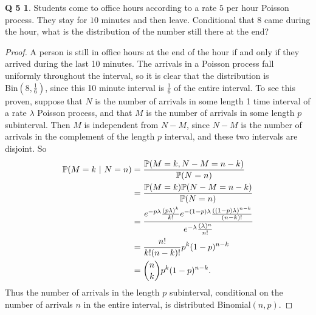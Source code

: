 \documentclass[12pt]{article}
\newcommand{\p}{\mathbb{P}}
\theoremstyle{definition}
\newtheorem*{prob5}{Q 5}
\begin{document}
\begin{prob5}
Students come to office hours according to a rate $5$ per hour Poisson process.  They stay for $10$ minutes and then leave.  Conditional that $8$ came during the hour, what is the distribution of the number still there at the end?
\end{prob5}

\begin{proof}
A person is still in office hours at the end of the hour if and only if they arrived during the last 10 minutes.  The arrivals in a Poisson process fall uniformly throughout the interval, so it is clear that the distribution is $\text{Bin}(8,\frac16)$, since this 10 minute interval is $\frac16$ of the entire interval.  To see this proven, suppose that $N$ is the number of arrivals in some length 1 time interval of a rate $\lambda$ Poisson process, and that $M$ is the number of arrivals in some length $p$ subinterval.  Then $M$ is independent from $N-M$, since $N-M$ is the number of arrivals in the complement of the length $p$ interval, and these two intervals are disjoint.  So
\begin{align*}
\p(M=k \ | \ N = n) &= \dfrac{\p(M = k, N-M = n-k)}{\p(N = n)}
\\
&=\dfrac{\p(M = k)\p(N-M = n-k)}{\p(N = n)}
\\
&= \dfrac{e^{-p\lambda} \frac{(p\lambda)^k}{k!}  e^{-(1-p)\lambda} \frac{((1-p)\lambda)^{n-k}}{(n-k)!}}{e^{-\lambda} \frac{(\lambda)^n}{n!}}
\\
&= \dfrac{n!}{k!(n-k)!}p^k(1-p)^{n-k}
\\
&= \dbinom{n}{k}p^k(1-p)^{n-k}.
\end{align*}
Thus the number of arrivals in the length $p$ subinterval, conditional on the number of arrivals $n$ in the entire interval, is distributed Binomial$(n,p)$.
\end{proof}
\end{document}
